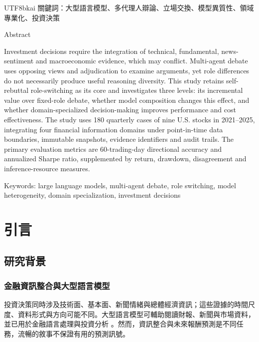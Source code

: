 \documentclass[12pt,a4paper]{article}
\begin{document}
\begin{CJK}{UTF8}{bkai}
\vspace{0.6cm}
\noindent 關鍵詞：大型語言模型、多代理人辯論、立場交換、模型異質性、領域專業化、投資決策
\clearpage
\begin{center}{\fontsize{16}{24}\selectfont Abstract\par}\end{center}
\noindent Investment decisions require the integration of technical, fundamental, news-sentiment and macroeconomic evidence, which may conflict. Multi-agent debate uses opposing views and adjudication to examine arguments, yet role differences do not necessarily produce useful reasoning diversity. This study retains self-rebuttal role-switching as its core and investigates three levels: its incremental value over fixed-role debate, whether model composition changes this effect, and whether domain-specialized decision-making improves performance and cost effectiveness. The study uses 180 quarterly cases of nine U.S. stocks in 2021--2025, integrating four financial information domains under point-in-time data boundaries, immutable snapshots, evidence identifiers and audit trails. The primary evaluation metrics are 60-trading-day directional accuracy and annualized Sharpe ratio, supplemented by return, drawdown, disagreement and inference-resource measures.

\vspace{0.6cm}
\noindent Keywords: large language models, multi-agent debate, role switching, model heterogeneity, domain specialization, investment decisions
\clearpage
\tableofcontents
\clearpage
{}

\section{引言}

\subsection{研究背景}

\subsubsection{金融資訊整合與大型語言模型}
投資決策同時涉及技術面、基本面、新聞情緒與總體經濟資訊；這些證據的時間尺度、資料形式與方向可能不同。大型語言模型可輔助閱讀財報、新聞與市場資料，並已用於金融語言處理與投資分析 \citep{lopezlira2023chatgpt,araci2019finbert,liu2023fingpt}。然而，資訊整合與未來報酬預測是不同任務，流暢的敘事不保證有用的預測訊號。


\end{CJK}
\end{document}
